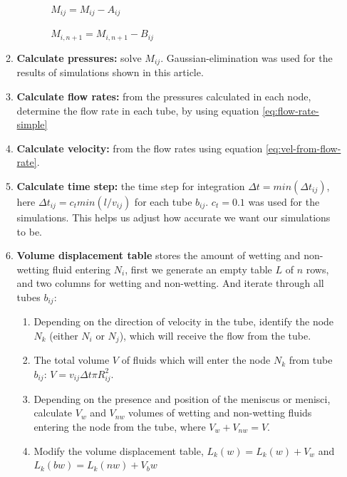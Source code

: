 \documentclass[
	12pt
] {article}
\begin{document}
\begin{enumerate}
\begin{enumerate}
\begin{enumerate}
\begin{enumerate}
				$M_{ij} = M_{ij} - A_{ij}$
				
				$M_{i,n + 1} = M_{i,n + 1} - B_{ij}$
			\end{enumerate}
		\end{enumerate}
		
		\item \textbf{Calculate pressures:} solve $M_{ij}$. Gaussian-elimination was used for the results of simulations shown in this article. 
		
		\item \textbf{Calculate flow rates:} from the pressures calculated in each node, determine the flow rate in each tube, by using equation \ref{eq:flow-rate-simple}
		
		\item \textbf{Calculate velocity:} from the flow rates using equation \ref{eq:vel-from-flow-rate}.
		
		\item \textbf{Calculate time step:} the time step for integration $\Delta t = min(\Delta t_{ij})$, here $\Delta t_{ij} = c_{t} min(l/v_{ij})$ for each tube $b_{ij}$. $c_{t} = 0.1$ was used for the simulations. This helps us adjust how accurate we want our simulations to be.
		
		\item \textbf{Volume displacement table} stores the amount of wetting and non-wetting fluid entering $N_i$, first we generate an empty table $L$ of $n$ rows, and two columns for wetting and non-wetting. And iterate through all tubes $b_{ij}$:
		
		\begin{enumerate}
			\item Depending on the direction of velocity in the tube, identify the node $N_k$ (either $N_i$ or $N_j$), which will receive the flow from the tube.
			
			\item The total volume $V$ of fluids which will enter the node $N_k$ from tube $b_{ij}$: $V = v_{ij} \Delta t \pi R_{ij}^2$.
			
			\item Depending on the presence and position of the meniscus or menisci,  calculate $V_{w}$ and $V_{nw}$ volumes of wetting and non-wetting fluids entering the node from the tube, where $V_{w} + V_{nw} = V$.
			
			\item Modify the volume displacement table, $L_k(w) = L_k(w) + V_w$ and $L_k(bw) = L_k(nw) + V_bw$
		\end{enumerate}
		

\end{enumerate}
\end{enumerate}
\end{document}

